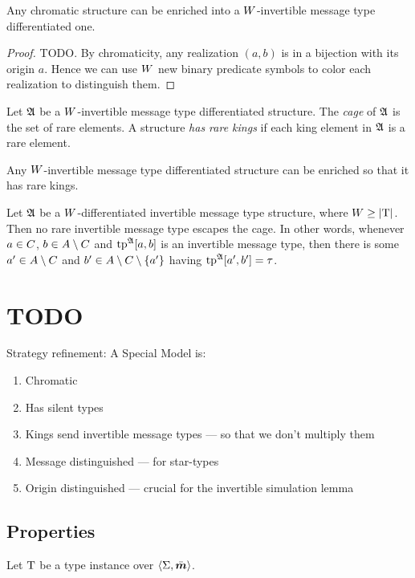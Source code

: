 \begin{remark}
Any chromatic structure can be enriched into a $W$-invertible message type
differentiated one.
\end{remark}
\begin{proof}
TODO.
By chromaticity, any realization $(a,b)$ is in a bijection with its origin $a$.
Hence we can use $W$ new binary predicate symbols to color each realization to
distinguish them.
\end{proof}

\begin{definition}
Let $\mathfrak{A}$ be a $W$-invertible message type differentiated structure.
The \emph{cage} of $\mathfrak{A}$ is the set of rare elements.
A structure \emph{has rare kings} if each king element in $\mathfrak{A}$ is a rare
element.
\end{definition}

\begin{remark}
Any $W$-invertible message type differentiated structure can be enriched so
that it has rare kings.
\end{remark}

\begin{remark}
Let $\mathfrak{A}$ be a $W$-differentiated invertible message type structure, where
$W\geq\left|\mathrm{T}\right|$.
Then no rare invertible message type escapes the cage.
In other words, whenever $a\in C$, $b\in A\setminus C$ and $\operatorname{tp}^{\mathfrak{A}}[a,b]$
is an invertible message type, then there is some ${a'}\in A\setminus C$ and
${b'}\in A\setminus C\setminus\left\{{a'}\right\}$ having $\operatorname{tp}^{\mathfrak{A}}[{a'},{b'}] = \tau$.
\end{remark}

\section{TODO}
Strategy refinement:
A Special Model is:
\begin{enumerate}
  \item Chromatic
  \item Has silent types
  \item Kings send invertible message types --- so that we don't multiply them
  \item Message distinguished --- for star-types
  \item Origin distinguished --- crucial for the invertible simulation lemma
\end{enumerate}

\subsection{Properties}
Let $\mathrm{T}$ be a type instance over $\left\langle \mathrm{\Sigma},\bar{\bm{m}} \right\rangle$.

